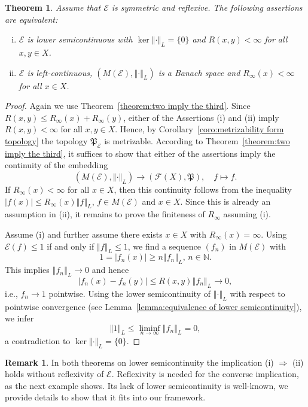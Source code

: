 \documentclass[a4paper,11pt,reqno]{amsart}
\newtheorem{theorem}[lemma]{Theorem}
\theoremstyle{definition}
\newtheorem{remark}[lemma]{Remark}
\numberwithin{equation}{section}
\newcommand{\cE}{{\mathcal E}}
\newcommand{\cF}{{\mathcal F}}
\newcommand{\N}{{\mathbb N}}
\newcommand{\av}[1]{\left\Vert #1\right\Vert}
\newcommand{\1}{\mathds{1}}
\begin{document}
\begin{theorem}\label{theorem:charcterization lower semicontinuity trivial kernel}
Assume that $\cE$ is symmetric and reflexive. The following assertions are equivalent: 
 \begin{enumerate}[(i)]
  \item $\cE$ is lower semicontinuous with $\ker \av{\cdot}_L = \{0\}$ and $R(x,y) < \infty$ for all $x,y \in X$. 
  \item $\cE$ is left-continuous, $(M(\cE),\av{\cdot}_L)$ is a Banach space and $R_\infty(x) < \infty$ for all $x \in X$. 
 \end{enumerate}
\end{theorem}
\begin{proof}
Again we use Theorem~\ref{theorem:two imply the third}. Since $R(x,y) \leq R_\infty(x) + R_\infty(y)$, either of the Assertions (i) and (ii) imply $R(x,y) < \infty$ for all $x,y \in X$. Hence, by Corollary~\ref{coro:metrizability form topology} the topology $\mathfrak{P}_\cE$ is metrizable. According to Theorem~\ref{theorem:two imply the third}, it suffices to show that either of the assertions imply the continuity of the embedding 
%
$$(M(\cE),\av{\cdot}_L) \to (\cF(X),\mathfrak{P}), \quad f \mapsto f.$$
%
If  $R_\infty(x) < \infty$ for all $x \in X$, then  this continuity follows from the inequality $|f(x)| \leq R_\infty(x) \av{f}_L$, $f \in M(\cE)$ and $x \in X$. Since this is already an assumption in (ii),  it remains to prove the finiteness of $R_\infty$ assuming (i). 

Assume (i) and further assume there exists $x \in X$ with $R_\infty(x) = \infty$. Using $\cE(f) \leq 1$ if and only if $\av{f}_L \leq 1$, we find a sequence $(f_n)$ in $M(\cE)$ with 
%
$$1 = |f_n(x)| \geq n \av{f_n}_L, \, n \in \N.$$
%
This implies $\av{f_n}_L \to 0$ and hence 
%
$$|f_n(x) - f_n(y)| \leq R(x,y) \av{f_n}_L \to 0,$$
%
i.e., $f_n \to 1$ pointwise. Using the lower semicontinuity of $\av{\cdot}_L$ with respect to pointwise convergence (see Lemma~\ref{lemma:equivalence of lower semicontinuity}), we infer 
%
$$\av{1}_L \leq \liminf_{n \to \infty} \av{f_n}_L = 0,$$
%
a contradiction to  $\ker \av{\cdot}_L = \{0\}$.  
\end{proof}

\begin{remark}\label{remark:lower semicontinuity without reflexivitiy}
 In both theorems on lower semicontinuity the implication (i)  $\Rightarrow$ (ii) holds without reflexivity of $\cE$. Reflexivity is needed for the converse implication, as the next  example shows. Its lack of lower semicontinuity is well-known, we  provide details to show that it fits into our framework.
\end{remark}
\end{document}
